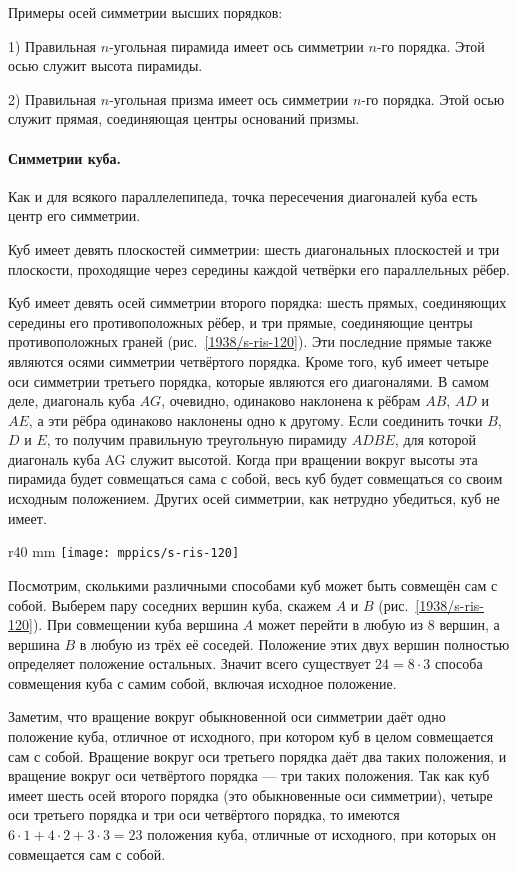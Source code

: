 Примеры осей симметрии высших порядков:

1) Правильная $n$-угольная пирамида имеет ось симметрии $n$-го порядка.
Этой осью служит высота пирамиды.

2) Правильная $n$-угольная призма имеет ось симметрии $n$-го порядка.
Этой осью служит прямая, соединяющая центры оснований призмы.

\paragraph{Симметрии куба.}\label{1938/s104}
Как и для всякого параллелепипеда, точка пересечения диагоналей куба есть центр его симметрии.

Куб имеет девять плоскостей симметрии: шесть диагональных плоскостей и три плоскости, проходящие через середины каждой четвёрки его параллельных рёбер.

Куб имеет девять осей симметрии второго порядка: шесть прямых, соединяющих середины его противоположных рёбер, и три прямые, соединяющие центры противоположных граней (рис.~\ref{1938/s-ris-120}).
Эти последние прямые также являются осями симметрии четвёртого порядка.
Кроме того, куб имеет четыре оси симметрии третьего порядка, которые являются его диагоналями.
В самом деле, диагональ куба $AG$, очевидно, одинаково наклонена к рёбрам $AB$, $AD$ и $AE$, а эти рёбра одинаково наклонены одно к другому.
Если соединить точки $B$, $D$ и $E$, то получим правильную треугольную пирамиду $ADBE$, для которой диагональ куба AG служит высотой.
Когда при вращении вокруг высоты эта пирамида будет совмещаться сама с собой, весь куб будет совмещаться со своим исходным положением.
Других осей симметрии, как нетрудно убедиться, куб не имеет.

\begin{wrapfigure}{r}{40 mm}
\vskip-6mm
\centering
\texttt{[image: mppics/s-ris-120]}
\caption{}\label{1938/s-ris-120}
\vskip-0mm
\end{wrapfigure}

Посмотрим, сколькими различными способами куб может быть совмещён сам с собой.
Выберем пару соседних вершин куба, скажем $A$ и $B$ (рис.~\ref{1938/s-ris-120}).
При совмещении куба вершина $A$ может перейти в любую из 8 вершин, 
а вершина $B$ в любую из трёх её соседей.
Положение этих двух вершин полностью определяет положение остальных.
Значит всего существует $24=8\cdot 3$  способа совмещения куба с самим собой, включая исходное положение.

Заметим, что вращение вокруг обыкновенной оси симметрии даёт одно положение куба, отличное от исходного, при котором куб в целом совмещается сам с собой.
Вращение вокруг оси третьего порядка даёт два таких положения, и вращение вокруг оси четвёртого порядка — три таких положения.
Так как куб имеет шесть осей второго порядка (это обыкновенные оси симметрии), четыре оси третьего порядка и три оси четвёртого порядка, то имеются $6\cdot 1 + 4\cdot 2 + 3\cdot 3 = 23$ положения куба, отличные от исходного, при которых он совмещается сам с собой. 

